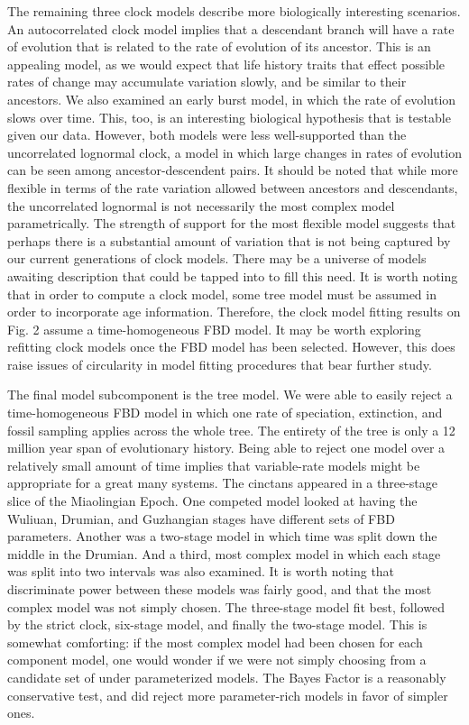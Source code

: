 \documentclass{article}
\begin{document}
The remaining three clock models describe more biologically interesting scenarios.
An autocorrelated clock model implies that a descendant branch will have a rate of evolution that is related to the rate of evolution of its ancestor.
This is an appealing model, as we would expect that life history traits that effect possible rates of change may accumulate variation slowly, and be similar to their ancestors. 
We also examined an early burst model, in which the rate of evolution slows over time.
This, too, is an interesting biological hypothesis that is testable given our data.
However, both models were less well-supported than the uncorrelated lognormal clock,
a model in which large changes in rates of evolution can be seen among ancestor-descendent pairs.
It should be noted that while more flexible in terms of the rate variation allowed between ancestors and descendants, the uncorrelated lognormal is not necessarily the most complex model parametrically. 
The strength of support for the most flexible model suggests that perhaps there is a substantial amount of variation that is not being captured by our current generations of clock models.
There may be a universe of models awaiting description that could be tapped into to fill this need.
It is worth noting that in order to compute a clock model, some tree model must be assumed in order to incorporate age information. 
Therefore, the clock model fitting results on Fig. 2 assume a time-homogeneous FBD model. 
It may be worth exploring refitting clock models once the FBD model has been selected.
However, this does raise issues of circularity in model fitting procedures that bear further study.

The final model subcomponent is the tree model.
We were able to easily reject a time-homogeneous FBD model in which one rate of speciation, extinction, and fossil sampling applies across the whole tree.
The entirety of the tree is only a 12 million year span of evolutionary history.
Being able to reject one model over a relatively small amount of time implies that variable-rate models might be appropriate for a great many systems.
The cinctans appeared in a three-stage slice of the Miaolingian Epoch. 
One competed model looked at having the Wuliuan, Drumian, and Guzhangian stages have different sets of FBD parameters. 
Another was  a two-stage model in which time was split down the middle in the Drumian.
And a third, most complex model in which each stage was split into two intervals was also examined. 
It is worth noting that discriminate power between these models was fairly good, and that the most complex model was not simply chosen.
The three-stage model fit best, followed by the strict clock, six-stage model, and finally the two-stage model. 
This is somewhat comforting: if the most complex model had been chosen for each component model, one would wonder if we were not simply choosing from a candidate set of under parameterized models. 
The Bayes Factor is a reasonably conservative test, and did reject more parameter-rich models in favor of simpler ones.
\end{document}
